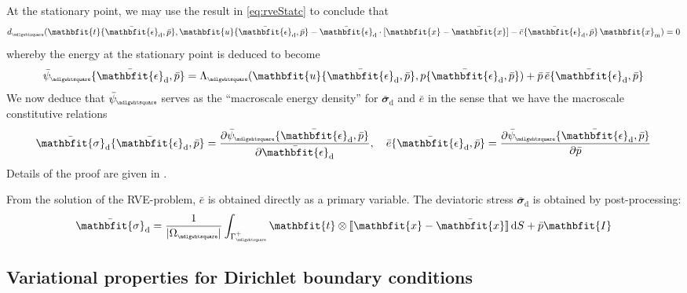 \documentclass[12pt,a4paper]{article}
\renewcommand{\ta}[1]{\mathbfit{#1}}
\renewcommand{\ts}[1]{\mathbfit{#1}}
\renewcommand{\Box}{\mdlgwhtsquare}
\DeclarePairedDelimiter{\jmp}{[\![}{]\!]}
\renewcommand{\dev}{\mathrm{d}}
\newcommand{\volume}{|\Omega_\rve|}
\newcommand{\epspargs}{\{{\bar{\ts\epsilon}}_\dev, \bar{p}\}}
\newcommand{\rve}{
  {\mathchoice
   {\mbox{\scalebox{0.67}{$\Box$}}}
   {\mbox{\scalebox{0.67}{$\Box$}}}
   {\mbox{\scalebox{0.5}{$\Box$}}}
   {\mbox{\scalebox{0.375}{$\Box$}}}
  }
}
\begin{document}
At the stationary point, we may use the result in \cref{eq:rveStatc} to conclude that
\begin{equation}
    d_\rve(\ta{t}\epspargs,\ta{u}\epspargs-\bar{\ts\epsilon}_\dev\cdot[\ta{x}-\bar{\ta{x}}]-\bar{e}\epspargs\,\ta{x}_\mean) = 0
\label{eq86}
\end{equation}
whereby the energy at the stationary point is deduced to become
\begin{equation}
    \bar{\psi}_\rve\epspargs =
    \Lambda_\rve(\ta{u}\epspargs,p\epspargs) + \bar{p}\,\bar{e}\epspargs
\label{eq87}
\end{equation}
We now deduce that $\bar{\psi}_\rve$ serves as the ``macroscale energy density'' for $\bar{\ts\sigma}_\dev$ and $\bar{e}$ in the sense that we have the macroscale constitutive relations
\begin{equation}
    \bar{\ts\sigma}_\dev\epspargs = \frac{\partial \bar{\psi}_\rve\epspargs}{\partial \bar{\ts\epsilon}_\dev}, \quad
     \bar{e}\epspargs = \frac{\partial \bar{\psi}_\rve\epspargs}{\partial \bar{p}}
\label{eq88}
\end{equation}
Details of the proof are given in .

From the solution of the RVE-problem, $\bar{e}$ is obtained directly as a primary variable.
The deviatoric stress $\bar{\ts\sigma}_\dev$ is obtained by post-processing:
\begin{align}
 \bar{\ts\sigma}_\dev = \frac{1}{\volume} \int_{\Gamma_\rve^+} \ta t \outerp \jmp{\ta x - \bar{\ta x}}\dif S + \bar{p}\ts I
\label{eq:weak_periodic_sigma_dev}
\end{align}


\subsection{Variational properties for Dirichlet boundary conditions}
\end{document}
